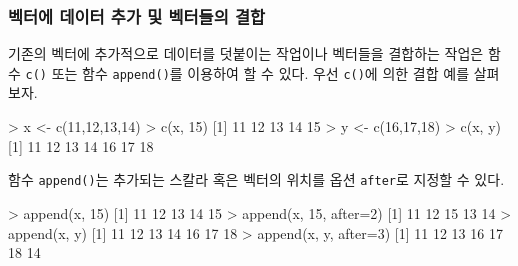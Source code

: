 \documentclass[
]{book}
\newenvironment{Shaded}{\begin{snugshade}}{\end{snugshade}}
\newcommand{\AttributeTok}[1]{\textcolor[rgb]{0.77,0.63,0.00}{#1}}
\newcommand{\DecValTok}[1]{\textcolor[rgb]{0.00,0.00,0.81}{#1}}
\newcommand{\FunctionTok}[1]{\textcolor[rgb]{0.00,0.00,0.00}{#1}}
\newcommand{\NormalTok}[1]{#1}
\newcommand{\OtherTok}[1]{\textcolor[rgb]{0.56,0.35,0.01}{#1}}
\newcommand{\SpecialCharTok}[1]{\textcolor[rgb]{0.00,0.00,0.00}{#1}}
\begin{document}
\hypertarget{uxbca1uxd130uxc5d0-uxb370uxc774uxd130-uxcd94uxac00-uxbc0f-uxbca1uxd130uxb4e4uxc758-uxacb0uxd569}{%
\subsubsection{벡터에 데이터 추가 및 벡터들의 결합}\label{uxbca1uxd130uxc5d0-uxb370uxc774uxd130-uxcd94uxac00-uxbc0f-uxbca1uxd130uxb4e4uxc758-uxacb0uxd569}}

기존의 벡터에 추가적으로 데이터를 덧붙이는 작업이나 벡터들을 결합하는 작업은 함수 \texttt{c()} 또는 함수 \texttt{append()}를 이용하여 할 수 있다. 우선 \texttt{c()}에 의한 결합 예를 살펴보자.

\begin{Shaded}
\begin{Highlighting}[]
\SpecialCharTok{\textgreater{}}\NormalTok{ x }\OtherTok{\textless{}{-}} \FunctionTok{c}\NormalTok{(}\DecValTok{11}\NormalTok{,}\DecValTok{12}\NormalTok{,}\DecValTok{13}\NormalTok{,}\DecValTok{14}\NormalTok{)}
\SpecialCharTok{\textgreater{}} \FunctionTok{c}\NormalTok{(x, }\DecValTok{15}\NormalTok{)}
\NormalTok{[}\DecValTok{1}\NormalTok{] }\DecValTok{11} \DecValTok{12} \DecValTok{13} \DecValTok{14} \DecValTok{15}
\SpecialCharTok{\textgreater{}}\NormalTok{ y }\OtherTok{\textless{}{-}} \FunctionTok{c}\NormalTok{(}\DecValTok{16}\NormalTok{,}\DecValTok{17}\NormalTok{,}\DecValTok{18}\NormalTok{)}
\SpecialCharTok{\textgreater{}} \FunctionTok{c}\NormalTok{(x, y)}
\NormalTok{[}\DecValTok{1}\NormalTok{] }\DecValTok{11} \DecValTok{12} \DecValTok{13} \DecValTok{14} \DecValTok{16} \DecValTok{17} \DecValTok{18}
\end{Highlighting}
\end{Shaded}

함수 \texttt{append()}는 추가되는 스칼라 혹은 벡터의 위치를 옵션 \texttt{after}로 지정할 수 있다.

\begin{Shaded}
\begin{Highlighting}[]
\SpecialCharTok{\textgreater{}} \FunctionTok{append}\NormalTok{(x, }\DecValTok{15}\NormalTok{)}
\NormalTok{[}\DecValTok{1}\NormalTok{] }\DecValTok{11} \DecValTok{12} \DecValTok{13} \DecValTok{14} \DecValTok{15}
\SpecialCharTok{\textgreater{}} \FunctionTok{append}\NormalTok{(x, }\DecValTok{15}\NormalTok{, }\AttributeTok{after=}\DecValTok{2}\NormalTok{)}
\NormalTok{[}\DecValTok{1}\NormalTok{] }\DecValTok{11} \DecValTok{12} \DecValTok{15} \DecValTok{13} \DecValTok{14}
\SpecialCharTok{\textgreater{}} \FunctionTok{append}\NormalTok{(x, y)}
\NormalTok{[}\DecValTok{1}\NormalTok{] }\DecValTok{11} \DecValTok{12} \DecValTok{13} \DecValTok{14} \DecValTok{16} \DecValTok{17} \DecValTok{18}
\SpecialCharTok{\textgreater{}} \FunctionTok{append}\NormalTok{(x, y, }\AttributeTok{after=}\DecValTok{3}\NormalTok{)}
\NormalTok{[}\DecValTok{1}\NormalTok{] }\DecValTok{11} \DecValTok{12} \DecValTok{13} \DecValTok{16} \DecValTok{17} \DecValTok{18} \DecValTok{14}
\end{Highlighting}
\end{Shaded}
\end{document}
